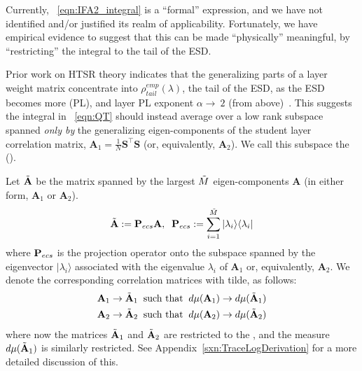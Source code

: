Currently, \EQN~\ref{eqn:IFA2_integral} is a ``formal'' expression, 
and we have not identified and/or justified its realm of applicability.
Fortunately, we have empirical evidence to suggest that this can be
made ``physically'' meaningful, by ``restricting'' the integral
to the tail of the ESD.

Prior work on HTSR theory indicates that the generalizing parts of a layer weight matrix concentrate
into $\rho_{tail}^{emp}(\lambda)$, the tail of the ESD, as the ESD becomes more \PowerLaw (PL),
and layer PL exponent  $\alpha\rightarrow\ 2$ (from above)~\cite{MM19_HTSR_ICML,MM20_SDM,MM18_TR_JMLRversion,MM20a_trends_NatComm,YTHx23_KDD}. 
This suggests the integral in \EQN~\ref{eqn:QT}
should instead average over a low rank subspace spanned \emph{only by} the generalizing eigen-components of the
student layer correlation matrix, $\mathbf{A}_{1}=\tfrac{1}{N}\mathbf{S}^{\top}\mathbf{S}$
(or, equivalently, $\mathbf{A}_{2}$).
We call this subspace the \EffectiveCorrelationSpace (\ECS).

Let $\tilde{\mathbf{A}}$ be the matrix spanned by the largest $\tilde{M}$ eigen-components $\mathbf{A}$
(in either form, $\mathbf{A}_{1}$ or $\mathbf{A}_{2}$).
\begin{align}
  \label{sqn:AecsDefined}
  \tilde{\mathbf{A}}:=\mathbf{P}_{ecs}\mathbf{A},\;\;  \mathbf{P}_{ecs}:= \sum_{i=1}^{\tilde{M}}|\lambda_{i}\rangle\langle\lambda_{i}|
\end{align}%
where $\mathbf{P}_{ecs}$ is the projection operator onto the subspace spanned by the eigenvector
$|\lambda_{i}\rangle$  associated with the eigenvalue $\lambda_{i}$ of $\mathbf{A}_{1}$ or, equivalently, $\mathbf{A}_{2}$.
We denote the corresponding \Student correlation matrices with tilde, as follows:
\begin{align}
  \mathbf{A}_{1} \rightarrow \tilde{\mathbf{A}}_{1}\;\; \text{such that}\;\; d\mu(\mathbf{A}_{1}) \rightarrow d\mu(\tilde{\mathbf{A}}_{1}) \\ \nonumber
  \mathbf{A}_{2} \rightarrow \tilde{\mathbf{A}}_{2}\;\; \text{such that}\;\; d\mu(\mathbf{A}_{2}) \rightarrow d\mu(\tilde{\mathbf{A}}_{2})  \nonumber
\end{align}
where now the matrices $\tilde{\mathbf{A}}_{1}$ and $\tilde{\mathbf{A}}_{2}$ are restricted to the \ECS, and the measure $d\mu(\tilde{\mathbf{A}}_{1})$ is similarly restricted.
 See Appendix~\ref{sxn:TraceLogDerivation} for a more detailed discussion of this.
   
